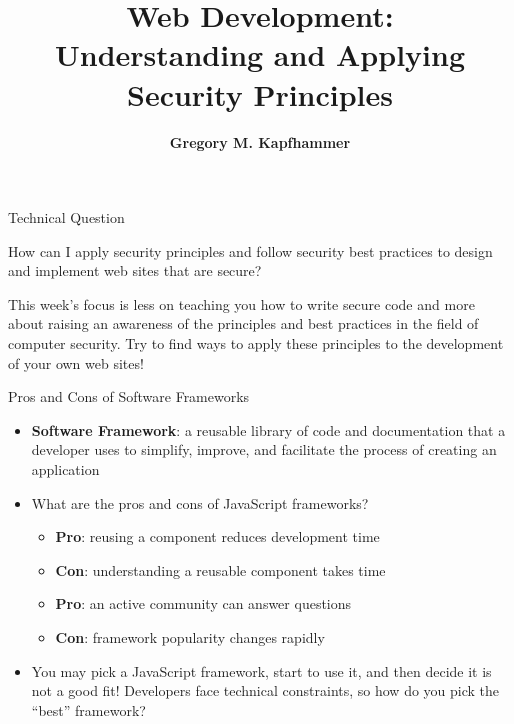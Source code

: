 \documentclass[14pt,aspectratio=169]{beamer}
\title{Web Development: \\ Understanding and Applying\\ Security Principles}
\author{{\bf Gregory M. Kapfhammer}}
\institute[shortinst]{{\bf Department of Computer Science, Allegheny College}}
\begin{document}
{
  \begin{frame}
    \titlepage
  \end{frame}
}

%
\begin{frame}{Technical Question}
  \hspace*{.15in}
  \begin{minipage}{5in}
    \vspace*{.5in}
    \begin{center}
      {\large How can I apply security principles and follow security best
      practices to design and implement web sites that are secure?}
    \end{center}
  \end{minipage}
  \vspace{1ex}
  \begin{center}
    \small This week's focus is less on teaching you how to write secure code
    and more about raising an awareness of the principles and best practices in
    the field of computer security. Try to find ways to apply these principles
    to the development of your own web sites! \\
  \end{center}
\end{frame}

%
\begin{frame}{Pros and Cons of Software Frameworks}
  \begin{itemize}
    \item {\bf Software Framework}: a reusable library of code and documentation
      that a developer uses to simplify, improve, and facilitate the process of
      creating an application
      \vspace*{-.15in}
    \item What are the pros and cons of JavaScript frameworks?
      \begin{itemize}
        \item {\bf Pro}: reusing a component reduces development time
        \item {\bf Con}: understanding a reusable component takes time
        \item {\bf Pro}: an active community can answer questions
        \item {\bf Con}: framework popularity changes rapidly
      \end{itemize}
      \vspace*{-.25in}
    \item You may pick a JavaScript framework, start to use it, and then decide
      it is not a good fit! Developers face technical constraints, so how do you
      pick the ``best'' framework?
  \end{itemize}
\end{frame}
\end{document}
